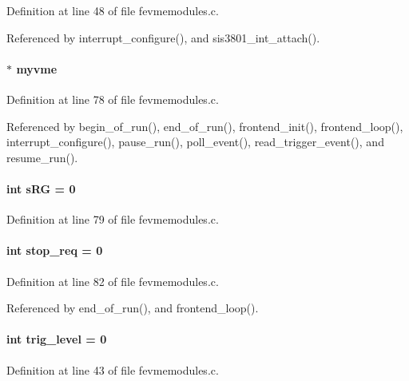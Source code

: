 Definition at line 48 of file fevmemodules.c.

Referenced by interrupt\_\-configure(), and sis3801\_\-int\_\-attach().
\paragraph[{myvme}]{$\ast$ {\bf myvme}}\hfill\label{fevmemodules_8c_aeab89db2ad759342a32dcd50a0a0156c}


Definition at line 78 of file fevmemodules.c.

Referenced by begin\_\-of\_\-run(), end\_\-of\_\-run(), frontend\_\-init(), frontend\_\-loop(), interrupt\_\-configure(), pause\_\-run(), poll\_\-event(), read\_\-trigger\_\-event(), and resume\_\-run().
\paragraph[{sRG}]{\setlength{\rightskip}{0pt plus 5cm}int {\bf sRG} = 0}\hfill\label{fevmemodules_8c_ac7cce186dd76dade3ec935efb745e1a0}


Definition at line 79 of file fevmemodules.c.
\paragraph[{stop\_\-req}]{\setlength{\rightskip}{0pt plus 5cm}int {\bf stop\_\-req} = 0}\hfill\label{fevmemodules_8c_a25a07c1f75f0b67144cbdc264ffdb09c}


Definition at line 82 of file fevmemodules.c.

Referenced by end\_\-of\_\-run(), and frontend\_\-loop().
\paragraph[{trig\_\-level}]{\setlength{\rightskip}{0pt plus 5cm}int {\bf trig\_\-level} = 0}\hfill\label{fevmemodules_8c_ad8650f66958ab0805468d3ed83722cd6}


Definition at line 43 of file fevmemodules.c.

